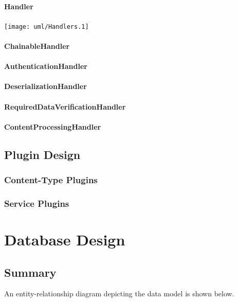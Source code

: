 \documentclass{report}
\begin{document}
			\subsubsection{Handler}
				\texttt{[image: uml/Handlers.1]}
			\subsubsection{ChainableHandler}
			\subsubsection{AuthenticationHandler}
			\subsubsection{DeserializationHandler}
			\subsubsection{RequiredDataVerificationHandler}
			\subsubsection{ContentProcessingHandler}

	\section{Plugin Design}
		\subsection{Content-Type Plugins}
		\subsection{Service Plugins}

\chapter{Database Design}
\section{Summary}

An entity-relationship diagram depicting the data model is shown below.\\

\end{document}
